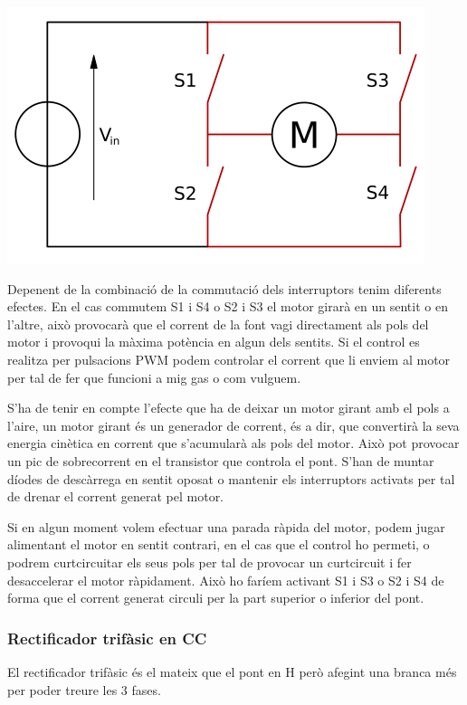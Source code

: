 \includegraphics[width=\textwidth]{VESC/Hbritge.png}\bigskip
 
Depenent de la combinació de la commutació dels interruptors tenim diferents efectes. En el cas commutem S1 i S4 o S2 i S3 el motor girarà en un sentit o en l'altre, això provocarà que el corrent de la font vagi directament als pols del motor i provoqui la màxima potència en algun dels sentits. Si el control es realitza per pulsacions PWM podem controlar el corrent que li enviem al motor per tal de fer que funcioni a mig gas o com vulguem. 
 
S'ha de tenir en compte l'efecte que ha de deixar un motor girant amb el pols a l'aire, un motor girant és un generador de corrent, és a dir, que convertirà la seva energia cinètica en corrent que s'acumularà als pols del motor. Això pot provocar un pic de sobrecorrent en el transistor que controla el pont. S'han de muntar díodes de descàrrega en sentit oposat o mantenir els interruptors activats per tal de drenar el corrent generat pel motor.

Si en algun moment volem efectuar una parada ràpida del motor, podem jugar alimentant el motor en sentit contrari, en el cas que el control ho permeti, o podrem curtcircuitar els seus pols per tal de provocar un curtcircuit i fer desaccelerar el motor ràpidament. Això ho faríem activant S1 i S3 o S2 i S4 de forma que el corrent generat circuli per la part superior o inferior del pont.

\subsubsection{Rectificador trifàsic en CC}
El rectificador trifàsic és el mateix que el pont en H però afegint una branca més per poder treure les 3 fases.

